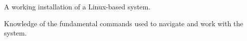   \item A working installation of a Linux-based system.
  \item Knowledge of the fundamental commands used to navigate and work with the
    system.
